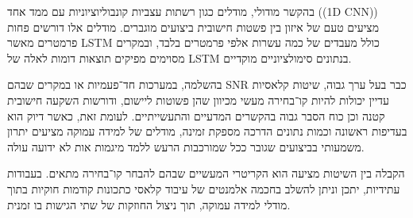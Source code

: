 בהקשר מודולי, מודלים כגון רשתות עצביות קונבוליוציוניות עם ממד אחד ((\textenglish{1D CNN})) מציעים טעם של איזון בין פשטות חישובית ביצועים מוגברים. מודלים אלו דורשים פחות פרמטרים מאשר \textenglish{LSTM} כולל מעבדים של כמה עשרות אלפי פרמטרים בלבד, ובמקרים מסוימים מפיקים תוצאות דומות לאלה של \textenglish{LSTM} בנתונים סימולציוניים מוקדיים.

בהשלמה, במערכות חד־פעמיות או במקרים שבהם \textenglish{SNR} כבר בעל ערך גבוה, שיטות קלאסיות עדיין יכולות להיות קו־בחירה מעשי מכיוון שהן פשוטות ליישום, ודורשות השקעה חישובית קטנה וכן כוח הסבר גבוה בהקשרים המדעיים והתעשייתיים. לעומת זאת, כאשר דיוק הוא בעדיפות ראשונה וכמות נתונים הדרכה מספקת זמינה, מודלים של למידה עמוקה מציעים יתרון משמעותי בביצועים שגובר ככל שמורכבות הרעש ללמד מיגמות אות לא ידועה עולה.

הקבלה בין השיטות מציעה הוא הקריטרי המעשיים שבהם להבחר קו־בחירה מתאים. בעבודות עתידיות, יתכן וניתן להשלב בחכמה אלמנטים של עיבוד קלאסי כתכונות קודמות חוקיות בתוך מודלי למידה עמוקה, תוך ניצול החוזקות של שתי הגישות בו זמנית.
